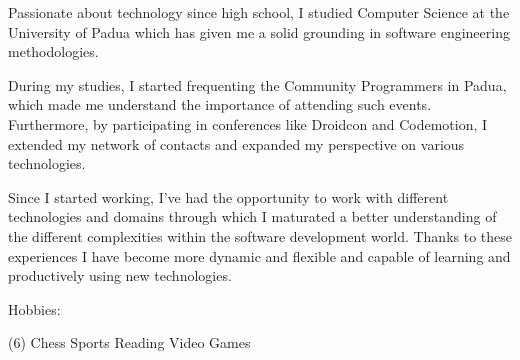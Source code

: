 

\begin{cvparagraph}

Passionate about technology since high school, I studied Computer Science at the University of Padua which has given me a solid grounding in software engineering methodologies.

During my studies, I started frequenting the Community Programmers in Padua, which made me understand the importance of attending such events.   Furthermore, by participating in conferences like Droidcon and Codemotion, I extended my network of contacts and expanded my perspective on various technologies.

Since I started working, I've had the opportunity to work with different technologies and domains through which I maturated a better understanding of the different complexities within the software development world. Thanks to these experiences I have become more dynamic and flexible and capable of learning and productively using new technologies.

Hobbies:
\begin{tasks}[style=itemize, column-sep=-35mm, label-align=center, label-offset={0mm}, label-width={3mm}, item-indent={40mm}](6)%
\task Chess
\task Sports
\task Reading 
\task Video Games

\end{tasks}
\end{cvparagraph}

